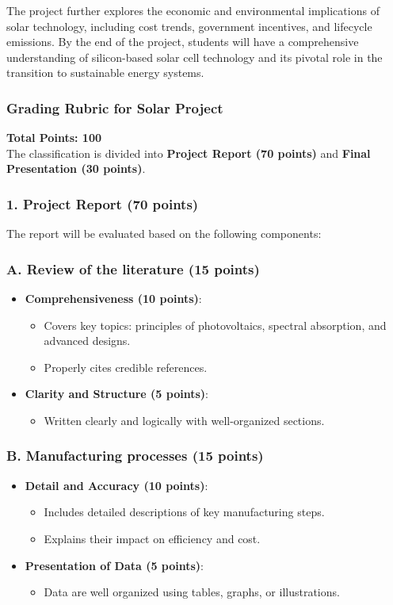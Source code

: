 \documentclass[11pt]{article}
\begin{document}
The project further explores the economic and environmental implications of solar technology, including cost trends, government incentives, and lifecycle emissions. By the end of the project, students will have a comprehensive understanding of silicon-based solar cell technology and its pivotal role in the transition to sustainable energy systems.
\subsubsection*{Grading Rubric for Solar Project}

\textbf{Total Points: 100}\\
The classification is divided into \textbf{Project Report (70 points)} and \textbf{Final Presentation (30 points)}.

\subsubsection*{1. Project Report (70 points)}
The report will be evaluated based on the following components:

\subsubsection*{A. Review of the literature (15 points)}
\begin{itemize}
    \item \textbf{Comprehensiveness (10 points)}:
    \begin{itemize}
        \item Covers key topics: principles of photovoltaics, spectral absorption, and advanced designs.
        \item Properly cites credible references.
    \end{itemize}
    \item \textbf{Clarity and Structure (5 points)}:
    \begin{itemize}
        \item Written clearly and logically with well-organized sections.
    \end{itemize}
\end{itemize}

\subsubsection*{B. Manufacturing processes (15 points)}
\begin{itemize}
    \item \textbf{Detail and Accuracy (10 points)}:
    \begin{itemize}
        \item Includes detailed descriptions of key manufacturing steps.
        \item Explains their impact on efficiency and cost.
    \end{itemize}
    \item \textbf{Presentation of Data (5 points)}:
    \begin{itemize}
        \item Data are well organized using tables, graphs, or illustrations.
    \end{itemize}
\end{itemize}
\end{document}
